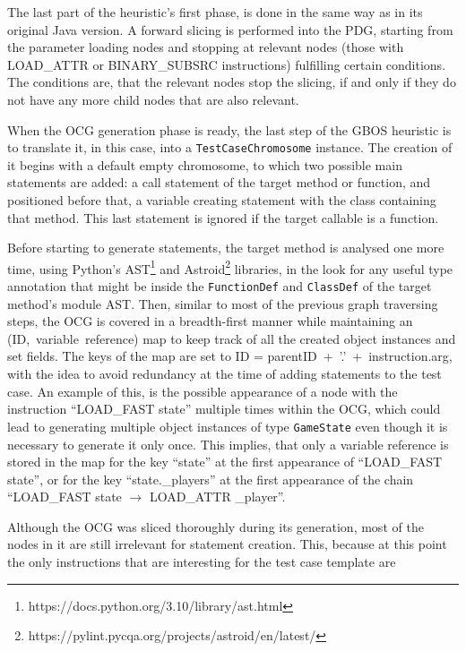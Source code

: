 \documentclass[%
  chapterprefix=false,%
  open=right,%
  twoside=true,%
  paper=a4,%
  logofile={Figures/logo.png},%
  thesistype=master,%
  UKenglish,%
]{se2thesis}
\newcommand{\classname}[1]{\texttt{#1}}
\begin{document}
The last part of the heuristic's first phase, is done in the same way as in its original Java version.
A forward slicing is performed into the PDG, starting from the parameter loading nodes and stopping at relevant nodes (those with LOAD\_ATTR or BINARY\_SUBSRC instructions) fulfilling certain conditions.
The conditions are, that the relevant nodes stop the slicing, if and only if they do not have any more child nodes that are also relevant.

When the OCG generation phase is ready, the last step of the GBOS heuristic is to translate it, in this case, into a \classname{TestCaseChromosome} instance.
The creation of it begins with a default empty chromosome, to which two possible main statements are added: a call statement of the target method or function, and positioned before that, a variable creating statement with the class containing that method.
This last statement is ignored if the target callable is a function.

Before starting to generate statements, the target method is analysed one more time, using Python's AST\footnote{https://docs.python.org/3.10/library/ast.html} and Astroid\footnote{https://pylint.pycqa.org/projects/astroid/en/latest/} libraries, in the look for any useful type annotation that might be inside the \classname{FunctionDef} and \classname{ClassDef} of the target method's module AST.\@ 
Then, similar to most of the previous graph traversing steps, the OCG is covered in a breadth-first manner while maintaining an (ID,~variable~reference) map to keep track of all the created object instances and set fields.
The keys of the map are set to ID = parentID~+~'.'~+~instruction.arg, with the idea  to avoid redundancy at the time of adding statements to the test case.
An example of this, is the possible appearance of a node with the instruction ``LOAD\_FAST state'' multiple times within the OCG, which could lead to generating multiple object instances of type \classname{GameState} even though it is necessary to generate it only once.
This implies, that only a variable reference is stored in the map for the key ``state'' at the first appearance of ``LOAD\_FAST state'', or for the key ``state.\_players'' at the first appearance of the chain ``LOAD\_FAST state \(\rightarrow\) LOAD\_ATTR \_player''.

Although the OCG was sliced thoroughly during its generation, most  of the nodes in it are still irrelevant for statement creation.
This, because at this point the only instructions that are interesting for the test case template are
\end{document}
